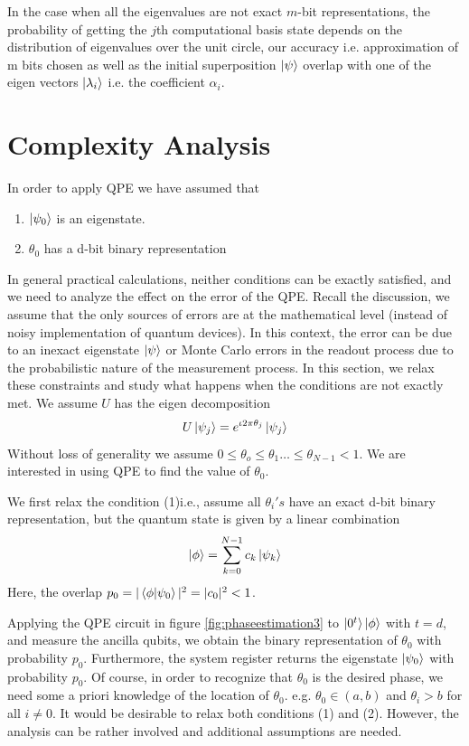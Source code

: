 In the case when all the eigenvalues are not exact $m$-bit representations, the probability of getting the $j$th computational basis state depends on the distribution of eigenvalues over the unit circle, our accuracy i.e. approximation of m bits chosen as well as the initial superposition $\ket{\psi}$ overlap with one of the eigen vectors $\ket{\lambda_i}$ i.e. the coefficient $\alpha_i$. 

\section{Complexity Analysis}
In order to apply QPE we have assumed that
\begin{enumerate}
    \item $\ket{\psi_0}$ is an eigenstate.
    \item $\theta_0$ has a d-bit binary representation
\end{enumerate}
In general practical calculations, neither conditions can be exactly satisfied, and we need to analyze the effect on the error of the QPE. Recall the discussion, we assume that the only sources of errors are at the mathematical level (instead of noisy implementation of quantum devices). In this context, the error can be due to an inexact eigenstate $\ket{\psi}$ or Monte Carlo errors in the readout process due to the probabilistic nature of the measurement process. In this section, we relax these constraints and study what happens when the conditions are not exactly met. We assume $U$ has the eigen decomposition
\[
U\ket{\psi_j}=e^{\iota 2\pi \theta_j}\ket{\psi_j}
\]
Without loss of generality we assume $0\leq \theta_o\leq \theta_1\ldots \leq \theta_{N-1}<1$. We are interested in using QPE to find the value of $\theta_0$.

We first relax the condition (1)i.e., assume all $\theta_i's$ have an exact d-bit binary representation, but the quantum state is given by a linear combination
\[
\ket{\phi}=\sum_{k =0}^{N-1} c_k\ket{\psi_k}
\]
Here, the overlap $p_0=|\braket{\phi|\psi_0}|^2=|c_0|^2 < 1$.

Applying the QPE circuit in figure \ref{fig:phaseestimation3} to $\ket{0^t}\ket{\phi}$ with $t=d$, and measure the ancilla qubits, we obtain the binary representation of $\theta_0$ with probability $p_0$. Furthermore, the system register returns the eigenstate $\ket{\psi_0}$ with probability $p_0$. Of course, in order to recognize that $\theta_0$ is the desired phase, we need some a priori knowledge of the location of $\theta_0$. e.g. $\theta_0 \in (a,b)$ and $\theta_i>b$ for all $i\neq 0$. It would be desirable to relax both conditions (1) and (2). However, the analysis can be rather involved and additional assumptions are needed.


